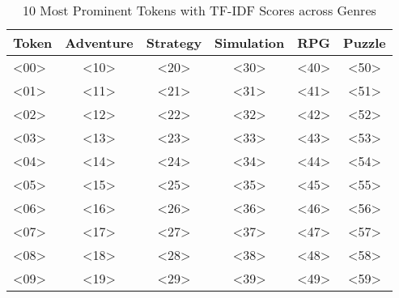 \begin{table}[h]
    \centering
    \begin{tabular}{l|c|c|c|c|c}
        Token & Adventure & Strategy & Simulation & RPG & Puzzle \\
        \hline
        <00> & <10> & <20> & <30> & <40> & <50> \\
        <01> & <11> & <21> & <31> & <41> & <51> \\
        <02> & <12> & <22> & <32> & <42> & <52> \\
        <03> & <13> & <23> & <33> & <43> & <53> \\
        <04> & <14> & <24> & <34> & <44> & <54> \\
        <05> & <15> & <25> & <35> & <45> & <55> \\
        <06> & <16> & <26> & <36> & <46> & <56> \\
        <07> & <17> & <27> & <37> & <47> & <57> \\
        <08> & <18> & <28> & <38> & <48> & <58> \\
        <09> & <19> & <29> & <39> & <49> & <59>
    \end{tabular}
    \caption{10 Most Prominent Tokens with TF-IDF Scores across Genres}
    \label{tab:prominent_tokens}
\end{table}